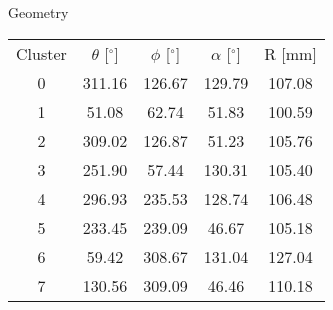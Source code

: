 \caption{Geometry}
\label{tab:Geo}
\begin{tabular}{ccccc}
\hline
Cluster  &  $\theta$ [$^\circ$]  &  $\phi$ [$^\circ$]  &  $\alpha$ [$^\circ$]  &  R [mm]  \\
0        &  311.16               &  126.67             &  129.79               &  107.08  \\
1        &  51.08                &  62.74              &  51.83                &  100.59  \\
2        &  309.02               &  126.87             &  51.23                &  105.76  \\
3        &  251.90               &  57.44              &  130.31               &  105.40  \\
4        &  296.93               &  235.53             &  128.74               &  106.48  \\
5        &  233.45               &  239.09             &  46.67                &  105.18  \\
6        &  59.42                &  308.67             &  131.04               &  127.04  \\
7        &  130.56               &  309.09             &  46.46                &  110.18  \\
\hline
\end{tabular}

